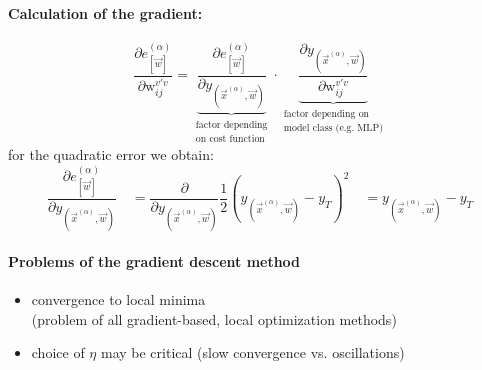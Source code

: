 \paragraph{Calculation of the gradient:}
\begin{equation} \label{eq:gradientMLP}
	\frac{\partial e_{[\vec{w}]}^{(\alpha)}}{\partial \mathrm{w}_{ij}^{v'v}}
	= \underbrace{ \frac{\partial e_{[\vec{w}]}^{(\alpha)}}{\partial 
		y_{(\vec{x}^{(\alpha)}, \vec{w})}} }_{
			\substack{\text{factor depending} \\
				\text{on cost function}}}
	  \cdot \underbrace{\frac{\partial y_{(\vec{x}^{(\alpha)}, \vec{w})}}{
		\partial \mathrm{w}_{ij}^{v'v}} }_{ 
			\substack{\text{factor depending on} \\
				\text{model class (e.g. MLP)}}}
\end{equation}
for the quadratic error we obtain: 
\begin{equation}
	\frac{\partial e_{[\vec{w}]}^{(\alpha)}}{
		\partial y_{(\vec{x}^{(\alpha)}, \vec{w})} } \quad
	=\frac{\partial}{\partial y_{(\vec{x}^{(\alpha)}, \vec{w})} }
	\frac{1}{2} (y_{(\vec{x}^{(\alpha)}, \vec{w})} - y_T)^2 \quad
	= y_{(\vec{x}^{(\alpha)}, \vec{w})} - y_T
\end{equation}
\paragraph{Problems of the gradient descent method}
\begin{itemize}
	\item convergence to local minima\\
              (problem of all gradient-based, local optimization methods)
	\item choice of $\eta$ may be critical (slow convergence vs. 	
		oscillations)
\end{itemize}


